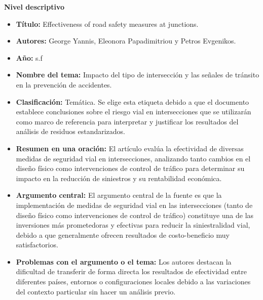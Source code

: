\documentclass[12pt]{article}
\begin{document}
\textbf{Nivel descriptivo}
\begin{itemize}
    \item \textbf{Título:} Effectiveness of road safety measures at junctions.\\


    \item \textbf{Autores:}  George Yannis, Eleonora Papadimitriou y Petros Evgenikos. \\
    
    \item \textbf{Año:} s.f \\
    
    \item \textbf{Nombre del tema:} Impacto del tipo de intersección y las señales 
    de tránsito en la prevención de accidentes. \\
    
 \item \textbf{Clasificación:} Temática. Se elige esta etiqueta debido a que el 
 documento establece conclusiones sobre el riesgo vial en intersecciones que se 
 utilizarán como marco de referencia para interpretar y justificar los resultados 
 del análisis de residuos estandarizados.\\
    
    \item \textbf{Resumen en una oración:} El artículo evalúa la efectividad de 
    diversas medidas de seguridad vial en intersecciones, analizando tanto cambios 
    en el diseño físico como intervenciones de control de tráfico para determinar
    su impacto en la reducción de siniestros y su rentabilidad económica. \\
    
    \item \textbf{Argumento central:} El argumento central de la fuente es que la 
    implementación de medidas de seguridad vial en las intersecciones (tanto de 
    diseño físico como intervenciones de control de tráfico) constituye una de 
    las inversiones más prometedoras y efectivas para reducir la siniestralidad 
    vial, debido a que generalmente ofrecen resultados de costo-beneficio muy satisfactorios. \\
    
    \item \textbf{Problemas con el argumento o el tema:} Los autores destacan la
    dificultad de transferir de forma directa los resultados de efectividad entre 
    diferentes países, entornos o configuraciones locales debido a las variaciones 
    del contexto particular sin hacer un análisis previo.\\

\end{itemize}
\end{document}
